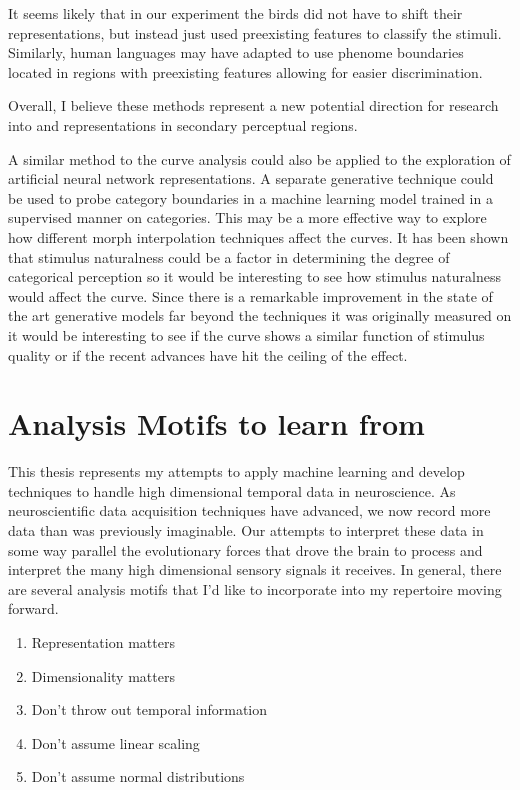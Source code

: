 It seems likely that in our experiment the birds did not have to shift their representations, but instead just used preexisting features to classify the stimuli. Similarly, human languages may have adapted to use phenome boundaries located in regions with preexisting features allowing for easier discrimination\cite{kuhl1975speech,stevens1981constraints}.

Overall, I believe these methods represent a new potential direction for research into \CP and representations in secondary perceptual regions.

A similar method to the \Thielk curve analysis could also be applied to the exploration of artificial neural network representations. A separate generative technique could be used to probe category boundaries in a machine learning model trained in a supervised manner on categories. This may be a more effective way to explore how different morph interpolation techniques affect the curves. It has been shown that stimulus naturalness could be a factor in determining the degree of categorical perception\cite{van1999categorical} so it would be interesting to see how stimulus naturalness would affect the \Thielk curve. Since there is a remarkable improvement in the state of the art generative models\cite{GAIA, van2016wavenet, waveglow} far beyond the techniques it was originally measured on it would be interesting to see if the \Thielk curve shows a similar function of stimulus quality or if the recent advances have hit the ceiling of the effect.

\section{Analysis Motifs to learn from}
This thesis represents my attempts to apply machine learning and develop techniques to handle high dimensional temporal data in neuroscience. As neuroscientific data acquisition techniques have advanced, we now record more data than was previously imaginable. Our attempts to interpret these data in some way parallel the evolutionary forces that drove the brain to process and interpret the many high dimensional sensory signals it receives. In general, there are several analysis motifs that I'd like to incorporate into my repertoire moving forward.

\begin{enumerate}
    \item Representation matters
    \item Dimensionality matters
    \item Don't throw out temporal information
    \item Don't assume linear scaling
    \item Don't assume normal distributions
\end{enumerate}


